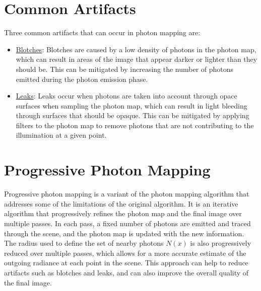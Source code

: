 \section{Common Artifacts}

Three common artifacts that can occur in photon mapping are:
\begin{itemize}
    \item \ul{Blotches}: Blotches are caused by a low density of photons in the photon map, which can result in areas of the image that appear darker or lighter than they should be. This can be mitigated by increasing the number of photons emitted during the photon emission phase.
    \item \ul{Leaks}: Leaks occur when photons are taken into account through opace surfaces when sampling the photon map, which can result in light bleeding through surfaces that should be opaque. This can be mitigated by applying filters to the photon map to remove photons that are not contributing to the illumination at a given point.
\end{itemize}

\section{Progressive Photon Mapping}

Progressive photon mapping is a variant of the photon mapping algorithm that addresses some of the limitations of the original algorithm. It is an iterative algorithm that progressively refines the photon map and the final image over multiple passes. In each pass, a fixed number of photons are emitted and traced through the scene, and the photon map is updated with the new information. The radius used to define the set of nearby photons $N(x)$ is also progressively reduced over multiple passes, which allows for a more accurate estimate of the outgoing radiance at each point in the scene. This approach can help to reduce artifacts such as blotches and leaks, and can also improve the overall quality of the final image.